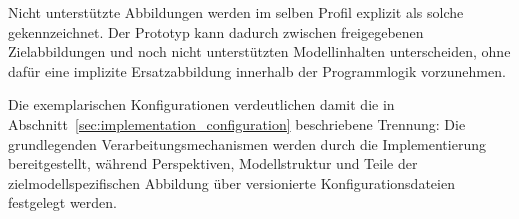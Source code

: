 Nicht unterstützte Abbildungen werden im selben Profil explizit als solche
gekennzeichnet. Der Prototyp kann dadurch zwischen freigegebenen
Zielabbildungen und noch nicht unterstützten Modellinhalten unterscheiden,
ohne dafür eine implizite Ersatzabbildung innerhalb der Programmlogik
vorzunehmen.

Die exemplarischen Konfigurationen verdeutlichen damit die in
Abschnitt~\ref{sec:implementation_configuration} beschriebene Trennung:
Die grundlegenden Verarbeitungsmechanismen werden durch die Implementierung
bereitgestellt, während Perspektiven, Modellstruktur und Teile der
zielmodellspezifischen Abbildung über versionierte Konfigurationsdateien
festgelegt werden.